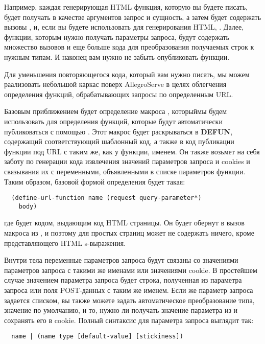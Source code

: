 Например, каждая генерирующая HTML функция, которую вы будете писать, будет получать в
качестве аргументов запрос и сущность, а затем будет содержать вызовы
,  и, если вы будете использовать 
для генерирования HTML, . Далее, функции, которым нужно получать
параметры запроса, будут содержать множество вызовов  и еще
больше кода для преобразования получаемых строк к нужным типам. И наконец вам нужно не
забыть опубликовать функции.

Для уменьшения повторяющегося кода, который вам нужно писать, мы можем раализовать
небольшой каркас поверх AllegroServe в целях облегчения определения функций,
обрабатывающих запросы по определенным URL.

Базовым приближением будет определение макроса , которыймы будем
использовать для определения функций, которые будут автоматически публиковаться с помощью
. Этот макрос будет раскрываться в \textbf{DEFUN}, содержащий
соответствующий шаблонный код, а также в код публикации функции под URL с таким же, как у
функции, именем. Он также возьмет на себя заботу по генерации кода извлечения значений
параметров запроса и cookies и связывания их с переменными, объявленными в списке
параметров функции. Таким образом, базовой формой определения 
будет такая:

\begin{lstlisting}
  (define-url-function name (request query-parameter*)
    body)
\end{lstlisting}

где  будет кодом, выдающим код HTML страницы. Он будет обернут в вызов макроса
 из , и поэтому для простых страниц может не содержать ничего, кроме
представляющего HTML s-выражения.

Внутри тела переменные параметров запроса будут связаны со значениями параметров запроса с
такими же именами или значениями cookie. В простейшем случае значением параметра запроса
будет строка, полученная из параметра запроса или поля POST-данных с таким же именем. Если
же параметр запроса задается списком, вы также можете задать автоматическое преобразование
типа, значение по умолчанию, и то, нужно ли получать значение параметра из и сохранять его
в cookie. Полный синтаксис для параметра запроса выглядит так:

\begin{verbatim}
  name | (name type [default-value] [stickiness])
\end{verbatim}

